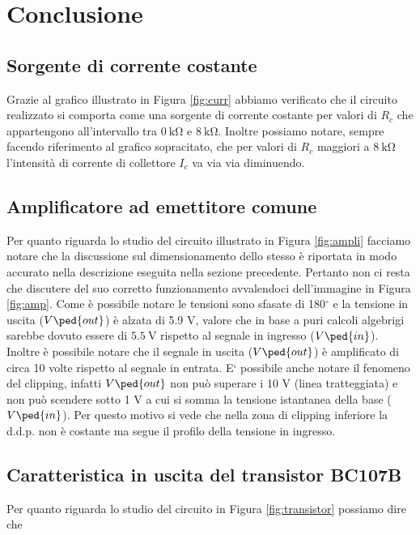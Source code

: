 \section*{Conclusione}

\subsection*{Sorgente di corrente costante}

Grazie al grafico illustrato in Figura \ref{fig:curr} abbiamo verificato che il circuito realizzato si comporta come una sorgente di corrente costante per valori di $R_c$ che appartengono all'intervallo tra $\SI{0}{\kilo\ohm}$ e $\SI{8}{\kilo\ohm}$. Inoltre possiamo notare, sempre facendo riferimento al grafico sopracitato, che per valori di $R_c$ maggiori a $\SI{8}{\kilo\ohm}$ l'intensità di corrente di collettore $I_c$ va via via diminuendo.

\subsection*{Amplificatore ad emettitore comune}

Per quanto riguarda lo studio del circuito illustrato in Figura \ref{fig:ampli} facciamo notare che la discussione sul dimensionamento dello stesso è riportata in modo accurato nella descrizione eseguita nella sezione precedente. Pertanto non ci resta che discutere del suo corretto funzionamento avvalendoci dell'immagine in Figura \ref{fig:amp}. Come è possibile notare le tensioni sono sfasate di 180$^\circ$ e la tensione in uscita ($V\ped{out}$) è alzata di 5.9 V, valore che in base a puri calcoli algebrigi sarebbe dovuto essere di $\SI{5.5}{\volt}$ rispetto al segnale in ingresso ($V\ped{in}$).
Inoltre è possibile notare che il segnale in uscita ($V\ped{out}$) è amplificato di circa 10 volte rispetto al segnale in entrata.
E` possibile anche notare il fenomeno del clipping, infatti $V\ped{out}$ non può superare i 10 V (linea tratteggiata) e non può scendere sotto 1 V a cui si somma la tensione istantanea della base ($V\ped{in}$). Per questo motivo si vede che nella zona di clipping inferiore la d.d.p. non è costante ma segue il profilo della tensione in ingresso.

\subsection*{Caratteristica in uscita del transistor BC107B}

Per quanto riguarda lo studio del circuito in Figura \ref{fig:transistor} possiamo dire che
